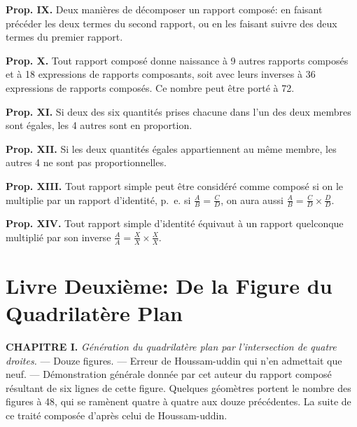 \documentclass[11pt,a4paper]{article}
\theoremstyle{plain}
\theoremstyle{definition}
\theoremstyle{remark}
\begin{document}
\textbf{Prop. IX.} Deux manières de décomposer un rapport composé: en faisant précéder les deux termes du second rapport, ou en les faisant suivre des deux termes du premier rapport.



\textbf{Prop. X.} Tout rapport composé donne naissance à 9 autres rapports composés et à 18 expressions de rapports composants, soit avec leurs inverses à 36 expressions de rapports composés. Ce nombre peut être porté à 72.



\textbf{Prop. XI.} Si deux des six quantités prises chacune dans l'un des deux membres sont égales, les 4 autres sont en proportion.



\textbf{Prop. XII.} Si les deux quantités égales appartiennent au même membre, les autres 4 ne sont pas proportionnelles.



\textbf{Prop. XIII.} Tout rapport simple peut être considéré comme composé si on le multiplie par un rapport d'identité, p.~e. si $\frac{A}{B} = \frac{C}{D}$, on aura aussi $\frac{A}{B} = \frac{C}{D} \times \frac{D}{D}$.



\textbf{Prop. XIV.} Tout rapport simple d'identité équivaut à un rapport quelconque multiplié par son inverse $\frac{A}{A} = \frac{X}{X} \times \frac{X}{X}$.





\clearpage






\section{Livre Deuxième: De la Figure du Quadrilatère Plan}

\label{sec:livre2}





\textbf{CHAPITRE I.} \textit{Génération du quadrilatère plan par l'intersection de quatre droites.} --- Douze figures. --- Erreur de Houssam-uddin qui n'en admettait que neuf. --- Démonstration générale donnée par cet auteur du rapport composé résultant de six lignes de cette figure. Quelques géomètres portent le nombre des figures à 48, qui se ramènent quatre à quatre aux douze précédentes. La suite de ce traité composée d'après celui de Houssam-uddin.
\end{document}
